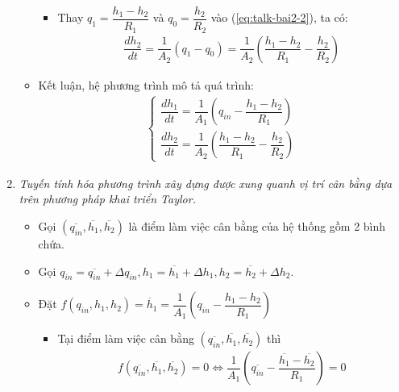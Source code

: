 \begin{enumerate}[\it a.]
\begin{itemize}
\begin{itemize}
                        \item Thay $q_1 = \dfrac{h_1 - h_2}{R_1}$ và $q_0 = \dfrac{h_2}{R_2}$ vào (\ref{eq:talk-bai2-2}), ta có:
                            \begin{align} \label{eq:talk-bai2-2-2}
                                \dfrac{dh_2}{dt} = \dfrac{1}{A_2} \left({q_1 - q_0}\right) = \dfrac{1}{A_2} \left({\dfrac{h_1 - h_2}{R_1} - \dfrac{h_2}{R_2}}\right)
                            \end{align}
                    \end{itemize}

                \item Kết luận, hệ phương trình mô tả quá trình:
                    \begin{align}
                        \left\{
                        \begin{array}{l}
                            \dfrac{dh_1}{dt} = \dfrac{1}{A_1} \left({q_{in} - \dfrac{h_1 - h_2}{R_1}}\right)\\ [.5cm]
                            \dfrac{dh_2}{dt} = \dfrac{1}{A_2} \left({\dfrac{h_1 - h_2}{R_1} - \dfrac{h_2}{R_2}}\right)
                        \end{array}
                        \right.
                    \end{align}
            \end{itemize}

        \item \textit{Tuyến tính hóa phương trình xây dựng được xung quanh vị trí cân bằng dựa trên phương pháp khai triển Taylor.}
            \begin{itemize}
                \item Gọi $\left({\overline{q_{in}}, \overline{h_1}, \overline{h_2}}\right)$ là điểm làm việc cân bằng của hệ thống gồm 2 bình chứa.

                \item Gọi $q_{in} = \overline{q_{in}} + \Delta q_{in}, h_1 = \overline{h_1} + \Delta h_1, h_2 = \overline{h_2} + \Delta h_2$.

                \item Đặt $f\left({q_{in}, h_1, h_2}\right) = \dot{h_1} = \dfrac{1}{A_1} \left({q_{in} - \dfrac{h_1 - h_2}{R_1}}\right)$
                    \begin{itemize}
                        \item Tại điểm làm việc cân bằng $\left({\overline{q_{in}}, \overline{h_1}, \overline{h_2}}\right)$ thì
                            \begin{align}
                                f\left({\overline{q_{in}}, \overline{h_1}, \overline{h_2}}\right) = 0 \Longleftrightarrow \dfrac{1}{A_1} \left({\overline{q_{in}} - \dfrac{\overline{h_1} - \overline{h_2}}{R_1}}\right) = 0
                            \end{align}


\end{itemize}
\end{itemize}
\end{enumerate}
